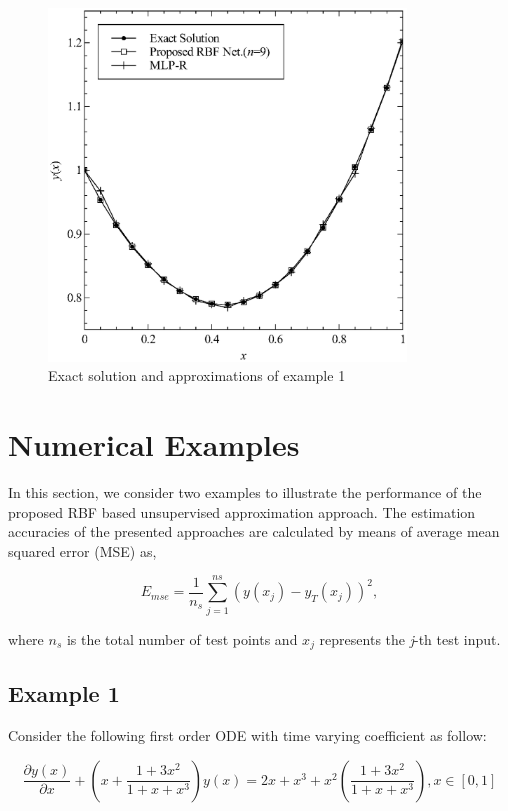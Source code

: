 \begin{figure}
\includegraphics[width=9.5cm]{Fig2.eps}
\caption{Exact solution and approximations of example 1}
\label{fig2}
\end{figure}


\section{Numerical Examples}
\label{sec:4}

In this section, we consider two examples to illustrate the performance of the proposed RBF based unsupervised approximation approach. The estimation accuracies of the presented approaches are calculated by means of average mean squared error (MSE) as,

\begin{equation}
E_{mse}=\frac{1}{n_s}\sum_{j=1}^{ns}\left ( y(x_j)-y_T(x_j) \right )^{2},
\end{equation}

\noindent
where $n_s$ is the total number of test points and $x_j$ represents the {\it{j}}-th test input.

\subsection{Example 1}

Consider the following first order ODE with time varying coefficient as follow:

\begin{equation}
\frac{\partial y(x)}{\partial x} + \left ( x + \frac{1+ 3x^2}{1+x+x^3}  \right )y(x)=2x+x^3+x^2\left (  \frac{1+ 3x^2}{1+x+x^3}  \right ), x\in [0 , 1]
\end{equation}

